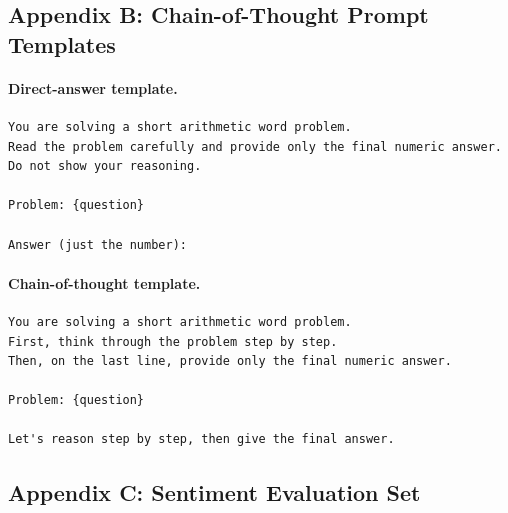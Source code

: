 \newpage
\subsection*{Appendix B: Chain-of-Thought Prompt Templates}
\label{app:cot-prompts}

\paragraph{Direct-answer template.}
\begin{verbatim}
You are solving a short arithmetic word problem.
Read the problem carefully and provide only the final numeric answer.
Do not show your reasoning.

Problem: {question}

Answer (just the number):
\end{verbatim}

\paragraph{Chain-of-thought template.}
\begin{verbatim}
You are solving a short arithmetic word problem.
First, think through the problem step by step.
Then, on the last line, provide only the final numeric answer.

Problem: {question}

Let's reason step by step, then give the final answer.
\end{verbatim}

\newpage
\subsection*{Appendix C: Sentiment Evaluation Set}
\label{app:sentiment-data}

